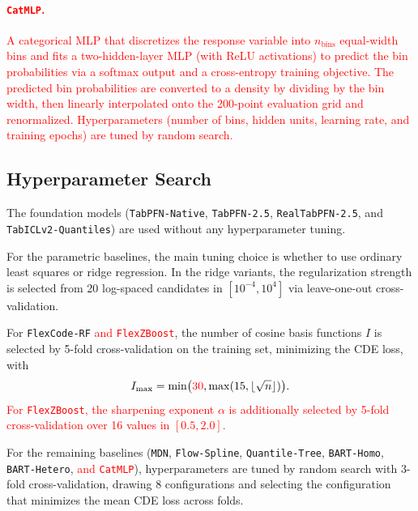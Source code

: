 \documentclass{article}
\newcommand{\method}[1]{\texttt{#1}}
\begin{document}
\paragraph{\textcolor{red}{\method{CatMLP}.}}
\textcolor{red}{A categorical MLP that discretizes the response variable into $n_{\mathrm{bins}}$ equal-width bins and fits a two-hidden-layer MLP (with ReLU activations) to predict the bin probabilities via a softmax output and a cross-entropy training objective. The predicted bin probabilities are converted to a density by dividing by the bin width, then linearly interpolated onto the 200-point evaluation grid and renormalized. Hyperparameters (number of bins, hidden units, learning rate, and training epochs) are tuned by random search.}

\subsection{Hyperparameter Search}
\label{app:tuning_details}

The foundation models (\method{TabPFN-Native}, \method{TabPFN-2.5},
\method{RealTabPFN-2.5}, and \method{TabICLv2-Quantiles}) are used without any
hyperparameter tuning.

For the parametric baselines, the main tuning choice is whether to use ordinary
least squares or ridge regression. In the ridge variants, the regularization
strength is selected from 20 log-spaced candidates in $[10^{-4},10^4]$ via
leave-one-out cross-validation.

For \method{FlexCode-RF} \textcolor{red}{and \method{FlexZBoost}}, the number of cosine basis functions $I$ is selected
by 5-fold cross-validation on the training set, minimizing the CDE loss, with
\[
I_{\max}=\min\bigl(\textcolor{red}{30},\max(15,\lfloor\sqrt{n}\rfloor)\bigr).
\]
\textcolor{red}{For \method{FlexZBoost}, the sharpening exponent $\alpha$ is additionally selected by 5-fold cross-validation over 16 values in $[0.5, 2.0]$.}

For the remaining baselines
(\method{MDN}, \method{Flow-Spline}, \method{Quantile-Tree},
\method{BART-Homo}, \method{BART-Hetero}, \textcolor{red}{and \method{CatMLP}}),
hyperparameters are tuned by random search with 3-fold cross-validation,
drawing 8 configurations and selecting the
configuration that minimizes the mean CDE loss across folds.
\end{document}
